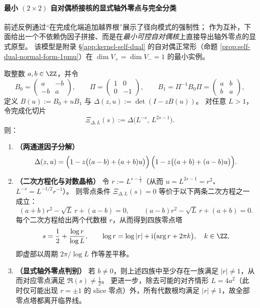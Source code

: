 \paragraph{最小 \texorpdfstring{$(2\times2)$}{(2x2)} 自对偶桥接核的显式轴外零点与完全分类}
前述反例通过“在完成化端追加越界根”展示了径向模式的强制性；
作为互补，下面给出一个不依赖伪因子拼接、而是在\emph{最小可控自对偶核}上直接导出轴外零点的显式原型。
该模型是附录 \S\ref{app:kernel-self-dual} 的自对偶正常形（命题 \ref{prop:self-dual-normal-form-1pmu}）在 \(\dim V_+=\dim V_-=1\) 的最小实例。

\begin{theorem}\label{thm:xi-2x2-selfdual-offcritical-template}
取整数 \(a,b\in\ZZ\)，并令
\[
  B_0=\begin{pmatrix}a&-b\\-b&a\end{pmatrix},\qquad
  \Pi=\begin{pmatrix}1&0\\0&-1\end{pmatrix},\qquad
  B_1=\Pi^{-1}B_0\Pi=\begin{pmatrix}a&b\\b&a\end{pmatrix},
\]
定义
\(
B(u):=B_0+uB_1
\)
与
\(
\Delta(z,u):=\det(I-zB(u))
\)。
对任意 \(L>1\)，令完成化切片
\[
  \Xi_{\Delta,L}(s):=\Delta\!\bigl(L^{-s},\,L^{2s-1}\bigr).
\]
则：
\begin{enumerate}
  \item \textbf{（两通道因子分解）}
  \[
  \Delta(z,u)
  =\Bigl(1-z\bigl((a-b)+(a+b)u\bigr)\Bigr)\,
   \Bigl(1-z\bigl((a+b)+(a-b)u\bigr)\Bigr).
  \]
  \item \textbf{（二次方程化与对数晶格）}
  令 \(r:=L^{s-\tfrac12}\)（从而 \(u=L^{2s-1}=r^{2}\)、\(L^{-s}=L^{-1/2}r^{-1}\)）。
  则零点条件 \(\Xi_{\Delta,L}(s)=0\) 等价于以下两条二次方程之一成立：
  \[
  (a+b)r^2-\sqrt L\,r+(a-b)=0,
  \qquad
  (a-b)r^2-\sqrt L\,r+(a+b)=0.
  \]
  每个二次方程给出两个代数根 \(r\)，从而得到四族零点塔
  \[
  s=\frac12+\frac{\log r}{\log L},
  \qquad
  \log r=\log|r|+\mathrm{i}\bigl(\arg r+2\pi k\bigr),\quad k\in\ZZ,
  \]
  即虚部以周期 \(2\pi/\log L\) 作等差平移。
  \item \textbf{（显式轴外零点判别）}
  若 \(b\neq 0\)，则上述四族中至少存在一族满足 \(|r|\neq 1\)，从而对应零点满足 \(\Re(s)\neq\tfrac12\)。
  更进一步，除去可能的对齐情形 \(L=4a^2\)（此时仅可能出现 \(r=\pm 1\) 的 slice 零点）外，所有代数根均满足 \(|r|\neq 1\)，故全部零点塔都离开临界线。
\end{enumerate}
\end{theorem}

